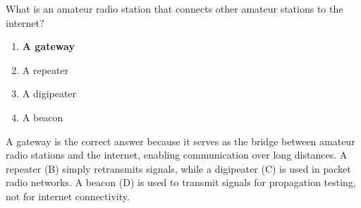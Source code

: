 \begin{tcolorbox}[colback=gray!10!white,colframe=black!75!black,title={T8C11}]
    What is an amateur radio station that connects other amateur stations to the internet?
    \begin{enumerate}[label=\Alph*),noitemsep]
        \item \textbf{A gateway}
        \item A repeater
        \item A digipeater
        \item A beacon
    \end{enumerate}
\end{tcolorbox}

A gateway is the correct answer because it serves as the bridge between amateur radio stations and the internet, enabling communication over long distances. A repeater (B) simply retransmits signals, while a digipeater (C) is used in packet radio networks. A beacon (D) is used to transmit signals for propagation testing, not for internet connectivity.
